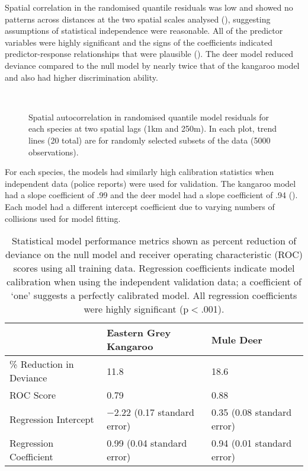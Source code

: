 Spatial correlation in the randomised quantile residuals was low and showed no patterns across distances at the two spatial scales analysed (), suggesting assumptions of statistical independence were reasonable. All of the predictor variables were highly significant and the signs of the coefficients indicated predictor-response relationships that were plausible (). The deer model reduced deviance compared to the null model by nearly twice that of the kangaroo model and also had higher discrimination ability.

\begin{figure*}[!t]
  \captionsetup[subfloat]{farskip=-2pt,nearskip=-2pt}
  \centering
  \\
  \caption[Spatial autocorrelation in randomised quantile model residuals for kangaroos and deer]{Spatial autocorrelation in randomised quantile model residuals for each species at two spatial lags (1km and 250m).  In each plot, trend lines (20 total) are for randomly selected subsets of the data (5000 observations).}
  \label{cal_sac}
\end{figure*}

For each species, the models had similarly high calibration statistics when independent data (police reports) were used for validation. The kangaroo model had a slope coefficient of .99 and the deer model had a slope coefficient of .94 (). Each model had a different intercept coefficient due to varying numbers of collisions used for model fitting.

\begin{table}[!t]
\caption[Statistical model performance for kangaroos and deer]{Statistical model performance metrics shown as percent reduction of deviance on the null model and receiver operating characteristic (ROC) scores using all training data. Regression coefficients indicate model calibration when using the independent validation data; a coefficient of `one' suggests a perfectly calibrated model.  All regression coefficients were highly significant (p$<$.001).}
\centering
\begin{tabularx}{0.9\textwidth}{lll} \toprule
                        	&Eastern Grey Kangaroo			&Mule Deer \\ \midrule 
\% Reduction in Deviance 	& 11.8							& 18.6  \\ 
ROC Score 					& 0.79							& 0.88	\\ 
Regression Intercept 		& $-$2.22 (0.17 standard error)	& 0.35 (0.08 standard error) \\ 
Regression Coefficient 		& 0.99 (0.04 standard error)	& 0.94 (0.01 standard error) \\ 
\bottomrule
\end{tabularx}
\label{cal_model_perf}
\end{table}

